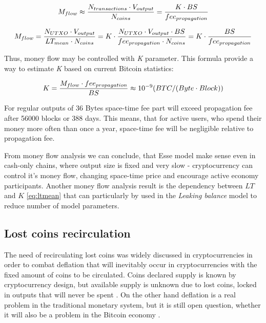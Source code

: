 \documentclass[]{article}   %
\newcommand{\authnote}[2]{\marginpar{\parbox{\marginparwidth}{\tiny %
  \textsf{#1 {\textcolor{blue}{notes: #2}}}}}%
  \textcolor{blue}{\textbf{\dag}}}
\newcommand{\authnote}[2]{
  \textsf{#1 \textcolor{blue}{: #2}}}
\newcommand{\authnote}[2]{}
\newcommand{\dnote}[1]{{\authnote{\textcolor{blue}{Dima notes}}{#1}}}
\newcommand{\esse}{Esse}
\begin{document}
\begin{equation}
M_{flow} \approx { N_{transactions} \cdot V_{output} \over N_{coins}} = {K \cdot BS \over fee_{propagation}}
\end{equation}
\dnote{end: estimate number of transactions per block}

\begin{equation}
M_{flow}={N_{UTXO} \cdot V_{output} \over LT_{mean} \cdot N_{coins}}=K \cdot {N_{UTXO} \cdot V_{output} \cdot BS \over fee_{propagation} \cdot N_{coins}} = K \cdot {BS \over fee_{propagation}}
\end{equation}

Thus, money flow may be controlled with \textit{K} parameter. This formula provide a way to estimate \textit{K} based on current Bitcoin statistics:

\begin{equation}
K={M_{flow} \cdot fee_{propagation} \over BS} \approx {10^{-9}}{(BTC / (Byte \cdot Block))}
\end{equation}

For regular outputs of 36 Bytes space-time fee part will exceed propagation fee after 56000 blocks or 388 days. This means, that for active users, who spend their money more often than once a year, space-time fee will be negligible relative to propagation fee.

From money flow analysis we can conclude, that \esse{} model make sense even in cash-only chains, where output size is fixed and very slow - cryptocurrency can control it's money flow, changing space-time price and encourage active economy participants. Another money flow analysis result is the dependency between $LT$ and $K$ \ref{eq:ltmean}
 that can particularly by used in the \textit{Leaking balance} model to reduce number of model parameters.


\subsection{Lost coins recirculation}

The need of recirculating lost coins was widely discussed in cryptocurrencies \cite{gjermundrod2014recirculating, gjermundrod2016going} in order to combat deflation that will inevitably occur in cryptocurrencies with the fixed amount of coins to be circulated. Coins declared supply is known by cryptocurrency design, but available supply is unknown due to lost coins, locked in outputs that will never be spent \cite{ron2013quantitative}. On the other hand deflation is a real problem in the traditional monetary system, but it is still open question, whether it will also be a problem in the Bitcoin economy \cite{bitcoinDeflationarySpiral, barber2012bitter}.
\end{document}
